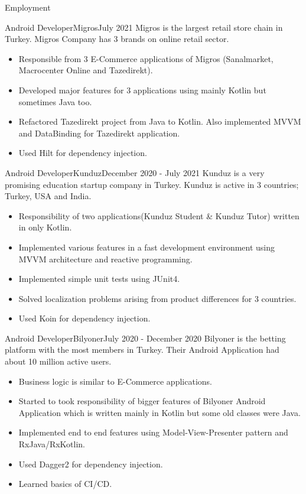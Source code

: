 \documentclass[]{mcdowellcv}
\begin{document}
	\makeheader
	
	\begin{cvsection}{Employment}
	
		\begin{cvsubsection}{Android Developer}{Migros}{July 2021}
		Migros is the largest retail store chain in Turkey. Migros Company has 3 brands on online retail sector.
			\begin{itemize}
				\item Responsible from 3 E-Commerce applications of Migros (Sanalmarket, Macrocenter Online and Tazedirekt).
				\item Developed major features for 3 applications using mainly Kotlin but sometimes Java too.
				\item Refactored Tazedirekt project from Java to Kotlin. Also implemented MVVM and DataBinding for Tazedirekt application.
				\item Used Hilt for dependency injection.
			\end{itemize}
		\end{cvsubsection}
		
		\begin{cvsubsection}{Android Developer}{Kunduz}{December 2020 - July 2021}
			Kunduz is a very promising education startup company in Turkey. Kunduz is active in 3 countries; Turkey, USA and India.		
			\begin{itemize}
				\item Responsibility of two applications(Kunduz Student \& Kunduz Tutor) written in only Kotlin.
				\item Implemented various features in a fast development environment using MVVM architecture and reactive programming. 
				\item Implemented simple unit tests using JUnit4.
				\item Solved localization problems arising from product differences for 3 countries.
				\item Used Koin for dependency injection.
			\end{itemize}
		\end{cvsubsection}
		
		\begin{cvsubsection}{Android Developer}{Bilyoner}{July 2020 - December 2020}
			Bilyoner is the betting platform with the most members in Turkey. Their Android Application had about 10 million active users.				
			\begin{itemize}
			    \item Business logic is similar to E-Commerce applications.
				\item Started to took responsibility of bigger features of Bilyoner Android Application which is written mainly in Kotlin but some old classes were Java.
				\item Implemented end to end features using Model-View-Presenter pattern and RxJava/RxKotlin.
				\item Used Dagger2 for dependency injection.
				\item Learned basics of CI/CD.
			\end{itemize}
		\end{cvsubsection}


\end{cvsection}
\end{document}
